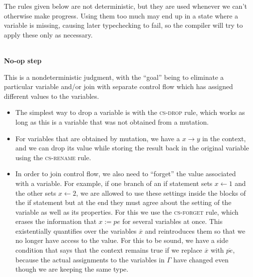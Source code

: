 \documentclass[acmsmall,nonacm]{acmart}
\newcommand{\proves}{\vdash}
\newcommand{\makes}{\dashv}
\newcommand{\constep}{\proves\cdot\makes}
\newcommand{\judgment}[2][]{\noindent\\\textbf{#1}\hspace{\stretch{1}}\fbox{$#2$}\nopagebreak}
\newcommand*{\axiom}[2][]{\infer[#1]{}{#2}}
\begin{document}
The rules given below are not deterministic, but they are used whenever we can't otherwise make progress. Using them too much may end up in a state where a variable is missing, causing later typechecking to fail, so the compiler will try to apply these only as necessary.

\judgment[No-op step]{\Gamma;\delta \constep\delta'}

This is a nondeterministic judgment, with the ``goal'' being to eliminate a particular variable and/or join with separate control flow which has assigned different values to the variables.
\begin{itemize}
\item The simplest way to drop a variable is with the \textsc{cs-drop} rule, which works as long as this is a variable that was not obtained from a mutation.
\item For variables that are obtained by mutation, we have a $x\to y$ in the context, and we can drop its value while storing the result back in the original variable using the \textsc{cs-rename} rule.
\item In order to join control flow, we also need to ``forget'' the value associated with a variable. For example, if one branch of an if statement sets $x\gets 1$ and the other sets $x\gets 2$, we are allowed to use these settings inside the blocks of the if statement but at the end they must agree about the setting of the variable as well as its properties. For this we use the \textsc{cs-forget} rule, which erases the information that $x:=pe$ for several variables at once. This existentially quantifies over the variables $\overline{x}$ and reintroduces them so that we no longer have access to the value. For this to be sound, we have a side condition that says that the context remains true if we replace $\overline{x}$ with $\overline{pe}$, because the actual assignments to the variables in $\Gamma$ have changed even though we are keeping the same type.
\end{itemize}
\end{document}
